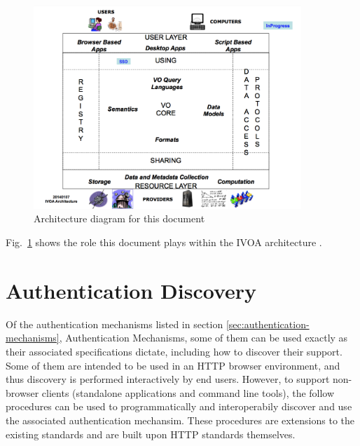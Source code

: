 \documentclass[11pt,a4paper]{ivoa}
\begin{document}
\begin{figure}
\centering

\includegraphics[width=0.9\textwidth]{SSO_image001.png}
\caption{Architecture diagram for this document}
\label{fig:archdiag}
\end{figure}

Fig.~\ref{fig:archdiag} shows the role this document plays within the
IVOA architecture \citep{2010ivoa.rept.1123A}.

\section{Authentication Discovery}

Of the authentication mechanisms listed in section \ref{sec:authentication-mechanisms}, Authentication Mechanisms, some of them can be used exactly as their associated specifications dictate, including how to discover their support.  Some of them are intended to be used in an HTTP browser environment, and thus discovery is performed interactively by end users.  However, to support non-browser clients (standalone applications and command line tools), the follow procedures can be used to programmatically and interoperabily discover and use the associated authentication mechansim.  These procedures are extensions to the existing standards and are built upon HTTP standards themselves.
\end{document}
